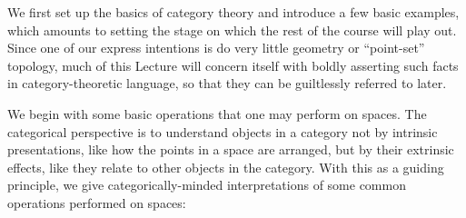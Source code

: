 We first set up the basics of category theory and introduce a few basic examples, which amounts to setting the stage on which the rest of the course will play out.
Since one of our express intentions is do very little geometry or ``point-set'' topology, much of this Lecture will concern itself with boldly asserting such facts in category-theoretic language, so that they can be guiltlessly referred to later.

We begin with some basic operations that one may perform on spaces.
The categorical perspective is to understand objects in a category not by intrinsic presentations, like how the points in a space are arranged, but by their extrinsic effects, like they relate to other objects in the category.
With this as a guiding principle, we give categorically-minded interpretations of some common operations performed on spaces:
